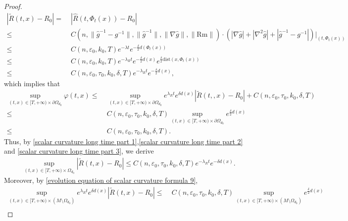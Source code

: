 \documentclass[12pt]{amsart}
\begin{document}
\begin{proof}
\begin{equation}\label{evolution equation of scalar curvature formula 9}
    \begin{split}
        |\tilde{R}(t, x) - R_0| =&\; |\hat{R}(t, \Phi_t(x)) - R_0|\\
        \leq&\;  C(n, \|\hat{g}^{-1} - g^{-1}\|, \|\hat{g}^{-1}\|, \|\nabla\hat{g}\|, \|\mathrm{Rm}\|)\cdot (|\nabla\hat{g}| + |\nabla^2 \hat{g}| + |\hat{g}^{-1} - g^{-1}|)\bigg|_{(t, \Phi_t(x))}\\
        \leq&\; C(n, \varepsilon_0, k_0, T) e^{-\lambda t} e^{-\frac{\delta}{2} d(\Phi_t(x))}\\
        \leq&\; C(n, \varepsilon_0, k_0, T) e^{-\lambda_R t} e^{-\frac{\delta}{2} d(x)}e^{\frac{\delta}{2}\mathrm{dist}(x, \Phi_t(x))}\\
        \leq&\; C(n,\varepsilon_0,\tau_0, k_0, \delta, T) e^{-\lambda_R t} e^{-\frac{\delta}{2} d(x)}, 
    \end{split}
\end{equation}
which implies that  
\begin{equation}\label{scalar curvature long time part 3}
    \begin{split}
        \sup_{(t, x)\in [T, +\infty)\times \partial\Omega_{d_0}} \varphi(t, x) \leq&\; \sup_{(t, x)\in [T, +\infty) \times \partial \Omega_{d_0}} e^{\lambda_R t} e^{\delta d(x)} |\tilde{R}(t, ,x)- R_0| + C(n, \varepsilon_0, \tau_0, k_0, \delta, T)\\
        \leq&\; C(n,\varepsilon_0,\tau_0, k_0, \delta, T) \sup_{(t, x)\in [T, +\infty) \times \partial\Omega_{d_0}} e^{\frac{\delta}{2} d(x)}\\
        \leq&\; C(n,\varepsilon_0,\tau_0, k_0, \delta, T).
    \end{split}
\end{equation}
Thus, by \eqref{scalar curvature long time part 1},\eqref{scalar curvature long time part 2} and \eqref{scalar curvature long time part 3}, we derive 
\begin{align}\label{evolution equation of scalar curvature formula 10}
    \sup_{(t, x)\in [T, +\infty)\times \Omega_{d_0}}|\tilde{R}(t, x) - R_0| \leq C(n,\varepsilon_0,\tau_0, k_0, \delta, T) e^{-\lambda_R t} e^{- \delta d(x)}.
\end{align}
Moreover, by \eqref{evolution equation of scalar curvature formula 9}, 
\begin{equation}\label{evolution equation of scalar curvature formula 11}
    \begin{split}
        \sup_{(t, x)\in [T, +\infty) \times (M\setminus \Omega_{d_0})} e^{\lambda_R t} e^{\delta d(x)}|\tilde{R}(t, x) - R_0| \leq&\; C(n,\varepsilon_0,\tau_0, k_0, \delta, T)\sup_{(t, x)\in [T, +\infty)\times (M\setminus\Omega_{d_0})}e^{\frac{\delta}{2}d(x)}\\

\end{split}
\end{equation}
\end{proof}
\end{document}
